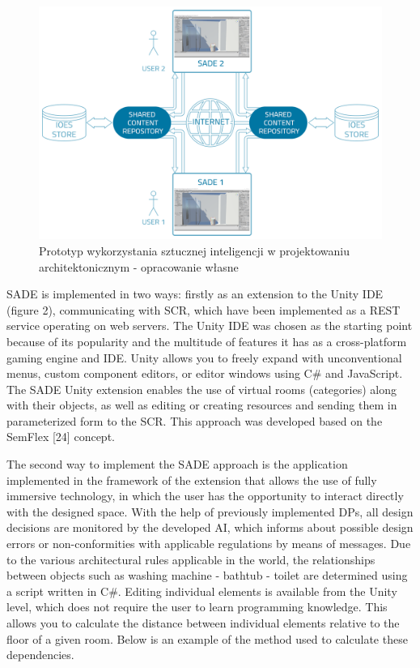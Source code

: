 \documentclass[runningheads]{llncs}
\begin{document}
\begin{figure}[H]
\centering
\includegraphics[width=\textwidth]{graf2.png}
\caption{Prototyp wykorzystania sztucznej inteligencji w projektowaniu architektonicznym - 
opracowanie własne} \label{fig2}
\end{figure}
SADE is implemented in two ways: firstly as an extension to the Unity IDE (figure 2), communicating with SCR, which have been implemented as a REST service operating on web servers. The Unity IDE was chosen as the starting point because of its popularity and the multitude of features it has as a cross-platform gaming engine and IDE. Unity allows you to freely expand with unconventional menus, custom component editors, or editor windows using C\# and JavaScript. The SADE Unity extension enables the use of virtual rooms (categories) along with their objects, as well as editing or creating resources and sending them in parameterized form to the SCR. This approach was developed based on the SemFlex [24] concept.

The second way to implement the SADE approach is the application implemented in the framework of the extension that allows the use of fully immersive technology, in which the user has the opportunity to interact directly with the designed space. With the help of previously implemented DPs, all design decisions are monitored by the developed AI, which informs about possible design errors or non-conformities with applicable regulations by means of messages.
Due to the various architectural rules applicable in the world, the relationships between objects such as washing machine - bathtub - toilet are determined using a script written in C\#. Editing individual elements is available from the Unity level, which does not require the user to learn programming knowledge. This allows you to calculate the distance between individual elements relative to the floor of a given room. Below is an example of the method used to calculate these dependencies. 
\end{document}
